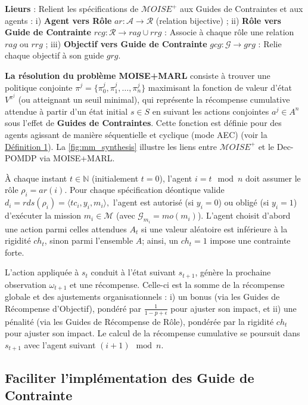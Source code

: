 \documentclass[dissemination]{jfsma}
\begin{document}
\medskip
\noindent \textbf{Lieurs} : Relient les spécifications de \(\mathcal{M}OISE^+\) aux Guides de Contraintes et aux agents :
i) \textbf{Agent vers Rôle} \(ar: \mathcal{A} \to \mathcal{R}\) (relation bijective) ; \quad
ii) \textbf{Rôle vers Guide de Contrainte} \(rcg: \mathcal{R} \to rag \cup rrg\) : Associe à chaque rôle une relation \(rag\) ou \(rrg\) ; \quad
iii) \textbf{Objectif vers Guide de Contrainte} \(gcg: \mathcal{G} \to grg\) : Relie chaque objectif à son guide \(grg\).

\textbf{La résolution du problème MOISE+MARL} consiste à trouver une politique conjointe 
$
\pi^j = \{\pi^j_0, \pi^j_1, \dots, \pi^j_n\}
$
maximisant la fonction de valeur d'état \(V^{\pi^j}\) (ou atteignant un seuil minimal), qui représente la récompense cumulative attendue à partir d'un état initial \(s \in S\) en suivant les actions conjointes \(a^j \in A^n\) sous l'effet de \textbf{Guides de Contraintes}. Cette fonction est définie pour des agents agissant de manière séquentielle et cyclique (mode AEC) (voir la \hyperref[eq:single_value_function]{Définition 1}). La \autoref{fig:mm_synthesis} illustre les liens entre \(\mathcal{M}OISE^+\) et le Dec-POMDP via MOISE+MARL.

À chaque instant \(t \in \mathbb{N}\) (initialement \(t=0\)), l'agent \(i = t \mod n\) doit assumer le rôle \(\rho_i = ar(i)\). Pour chaque spécification déontique valide 
$
d_i = rds(\rho_i) = \langle tc_i, y_i, m_i \rangle,
$
l'agent est autorisé (si \(y_i=0\)) ou obligé (si \(y_i=1\)) d'exécuter la mission \(m_i \in \mathcal{M}\) (avec \(\mathcal{G}_{m_i} = mo(m_i)\)). L'agent choisit d'abord une action parmi celles attendues \(A_t\) si une valeur aléatoire est inférieure à la rigidité \(ch_t\), sinon parmi l'ensemble \(A\); ainsi, un \(ch_t = 1\) impose une contrainte forte.

L'action appliquée à \(s_t\) conduit à l'état suivant \(s_{t+1}\), génère la prochaine observation \(\omega_{t+1}\) et une récompense. Celle-ci est la somme de la récompense globale et des ajustements organisationnels : 
i) un bonus (via les Guides de Récompense d'Objectif), pondéré par \(\frac{1}{1-p+\epsilon}\) pour ajuster son impact, et
ii) une pénalité (via les Guides de Récompense de Rôle), pondérée par la rigidité \(ch_t\) pour ajuster son impact.
Le calcul de la récompense cumulative se poursuit dans \(s_{t+1}\) avec l'agent suivant \((i+1) \mod n\).

\subsection{Faciliter l'implémentation des \textbf{Guide de Contrainte}}
\end{document}
